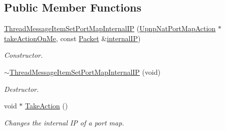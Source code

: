 \subsection*{Public Member Functions}
\begin{DoxyCompactItemize}
\item 
\hyperlink{class_thread_message_item_set_port_map_internal_i_p_a77c4c9e319f6b98359de0441ea019801}{ThreadMessageItemSetPortMapInternalIP} (\hyperlink{class_upnp_nat_port_map_action}{UpnpNatPortMapAction} $\ast$\hyperlink{class_thread_message_item_set_port_map_internal_i_p_a98778535e120a46f73f7a7ab85856b0e}{takeActionOnMe}, const \hyperlink{class_packet}{Packet} \&\hyperlink{class_thread_message_item_set_port_map_internal_i_p_affffbd207f88ef6e0df40e7c1103d22e}{internalIP})
\begin{DoxyCompactList}\small\item\em Constructor. \item\end{DoxyCompactList}\item 
\hypertarget{class_thread_message_item_set_port_map_internal_i_p_a272d3a103438d34acf9387c7d05d7e16}{
\hyperlink{class_thread_message_item_set_port_map_internal_i_p_a272d3a103438d34acf9387c7d05d7e16}{$\sim$ThreadMessageItemSetPortMapInternalIP} (void)}
\label{class_thread_message_item_set_port_map_internal_i_p_a272d3a103438d34acf9387c7d05d7e16}

\begin{DoxyCompactList}\small\item\em Destructor. \item\end{DoxyCompactList}\item 
void $\ast$ \hyperlink{class_thread_message_item_set_port_map_internal_i_p_ae6f401b5688f877b518626a49ad8935e}{TakeAction} ()
\begin{DoxyCompactList}\small\item\em Changes the internal IP of a port map. \item\end{DoxyCompactList}\end{DoxyCompactItemize}
